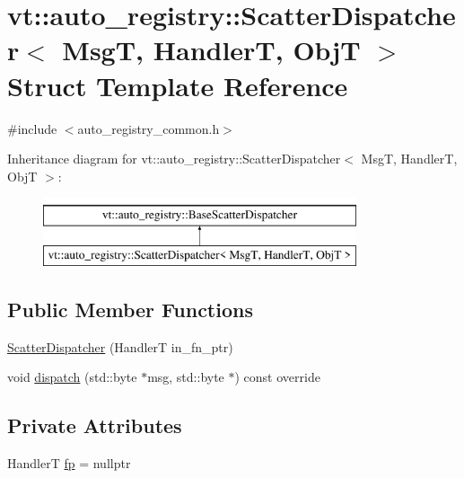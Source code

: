 \hypertarget{structvt_1_1auto__registry_1_1_scatter_dispatcher}{}\section{vt\+:\+:auto\+\_\+registry\+:\+:Scatter\+Dispatcher$<$ MsgT, HandlerT, ObjT $>$ Struct Template Reference}
\label{structvt_1_1auto__registry_1_1_scatter_dispatcher}


{\ttfamily \#include $<$auto\+\_\+registry\+\_\+common.\+h$>$}

Inheritance diagram for vt\+:\+:auto\+\_\+registry\+:\+:Scatter\+Dispatcher$<$ MsgT, HandlerT, ObjT $>$\+:\begin{figure}[H]
\begin{center}
\leavevmode
\includegraphics[height=2.000000cm]{structvt_1_1auto__registry_1_1_scatter_dispatcher}
\end{center}
\end{figure}
\subsection*{Public Member Functions}
\begin{DoxyCompactItemize}
\item 
\hyperlink{structvt_1_1auto__registry_1_1_scatter_dispatcher_a1059ed7e28fe51d138a6945593dce385}{Scatter\+Dispatcher} (HandlerT in\+\_\+fn\+\_\+ptr)
\item 
void \hyperlink{structvt_1_1auto__registry_1_1_scatter_dispatcher_a1be99f3b95f4573106bd4bee68c8fd96}{dispatch} (std\+::byte $\ast$msg, std\+::byte $\ast$) const override
\end{DoxyCompactItemize}
\subsection*{Private Attributes}
\begin{DoxyCompactItemize}
\item 
HandlerT \hyperlink{structvt_1_1auto__registry_1_1_scatter_dispatcher_ab46d5400a04ca6282b2db43de7d0ca31}{fp} = nullptr
\end{DoxyCompactItemize}


